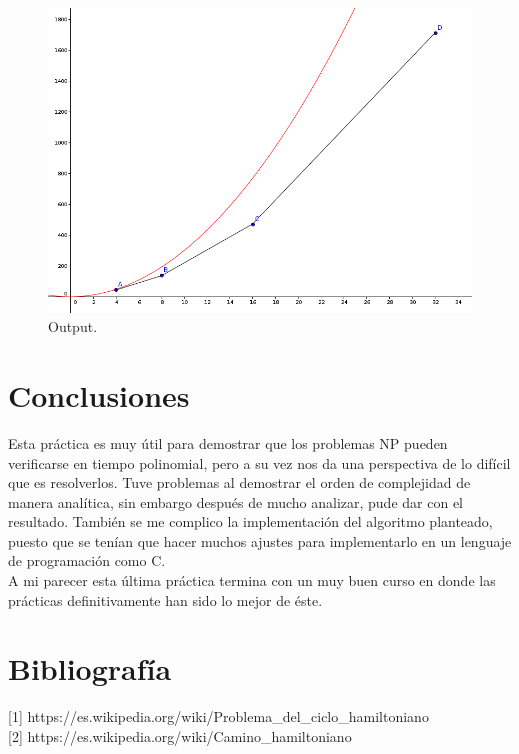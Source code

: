\documentclass[12pt]{report}
\begin{document}
	\begin{figure}[H]
		\includegraphics[width=14.7cm]{imagenes/output.png}
		\centering
		\caption{Output.}
		\centering
	\end{figure}
	  
\newpage		
\section{Conclusiones}
Esta práctica es muy útil para demostrar que los problemas NP pueden verificarse en tiempo polinomial, pero a su vez nos da una perspectiva de lo difícil que es resolverlos. Tuve problemas al demostrar el orden de complejidad de manera analítica, sin embargo después de mucho analizar, pude dar con el resultado. También se me complico la implementación del algoritmo planteado, puesto que se tenían que hacer muchos ajustes para implementarlo en un lenguaje de programación como C.\\
A mi parecer esta última práctica termina con un muy buen curso en donde las prácticas definitivamente han sido lo mejor de éste.

\newpage

\section{Bibliografía}

[1] https://es.wikipedia.org/wiki/Problema\_del\_ciclo\_hamiltoniano\\

[2] https://es.wikipedia.org/wiki/Camino\_hamiltoniano\\
	
	
\end{document}
